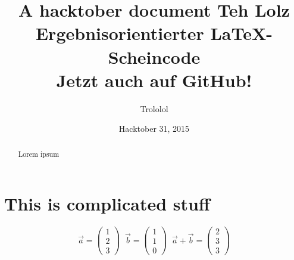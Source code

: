 \documentclass{article}
\title{A hacktober document}
\author{Trololol}
\date{Hacktober 31, 2015}
\title{
    Teh Lolz\\
  \vspace{7mm}
    Ergebnisorientierter {\LaTeX}-Scheincode\\
  \vspace{1cm}
  \large {
        Jetzt auch auf GitHub!\\
      \vspace{1cm}
    }
}
\begin{document}
	\maketitle	

	\thispagestyle{empty}
	\begin{abstract}
		Lorem ipsum
	\end{abstract}
	
	\newpage
	
	\section{This is complicated stuff}
	\begin{equation*}
		\vec{a} =
		\begin{pmatrix}
		1 \\
		2 \\
		3
		\end{pmatrix}\;\;
		\vec{b} =
		\begin{pmatrix}
		1 \\
		1 \\
		0
		\end{pmatrix}\;\;
		\vec{a} + \vec{b} = \begin{pmatrix}
		2 \\
		3 \\
		3
		\end{pmatrix}
	\end{equation*}
\end{document}

